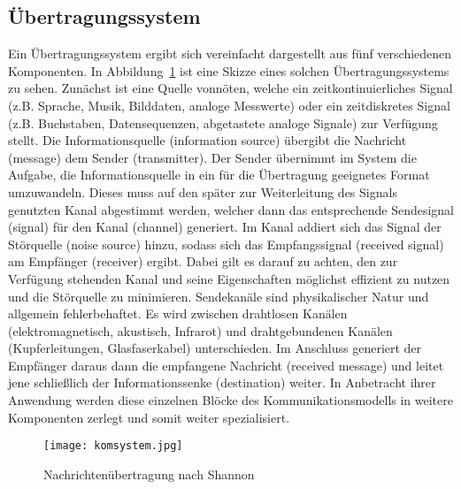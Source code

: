 \subsection{Übertragungssystem}
\label{subsec:aufbauueber}

Ein Übertragungssystem ergibt sich vereinfacht dargestellt aus fünf verschiedenen Komponenten. In Abbildung~\ref{fig:komsystem} ist eine Skizze eines solchen Übertragungssystems zu sehen. Zunächst ist eine Quelle vonnöten, welche ein zeitkontinuierliches Signal (z.B. Sprache, Musik, Bilddaten, analoge Messwerte) oder ein zeitdiskretes Signal (z.B. Buchstaben, Datensequenzen, abgetastete analoge Signale) zur Verfügung stellt. Die Informationsquelle (information source) übergibt die Nachricht (message) dem Sender (transmitter). Der Sender übernimmt im System die Aufgabe, die Informationsquelle in ein für die Übertragung geeignetes Format umzuwandeln. Dieses muss auf den später zur Weiterleitung des Signals genutzten Kanal abgestimmt werden, welcher dann das entsprechende Sendesignal (signal) für den Kanal (channel) generiert. Im Kanal addiert sich das Signal der Störquelle (noise source) hinzu, sodass sich das Empfangssignal (received signal) am Empfänger (receiver) ergibt. Dabei gilt es darauf zu achten, den zur Verfügung stehenden Kanal und seine Eigenschaften möglichst effizient zu nutzen und die Störquelle zu minimieren. Sendekanäle sind physikalischer Natur und allgemein fehlerbehaftet. Es wird zwischen drahtlosen Kanälen (elektromagnetisch, akustisch, Infrarot) und drahtgebundenen Kanälen (Kupferleitungen, Glasfaserkabel) unterschieden. Im Anschluss generiert der Empfänger daraus dann die empfangene Nachricht (received message) und leitet jene schließlich der Informationssenke (destination) weiter. In Anbetracht ihrer Anwendung werden diese einzelnen Blöcke des Kommunikationsmodells in weitere Komponenten zerlegt und somit weiter spezialisiert. \cite{wernerNachrichtentechnikEinfuehrungFuer2010}

\begin{figure}[H]
	\centering
	\texttt{[image: komsystem.jpg]}
	\caption[Nachrichtenübertragung nach Shannon]{Nachrichtenübertragung nach Shannon} 
	\cite{shannon}
	\label{fig:komsystem}
\end{figure}

